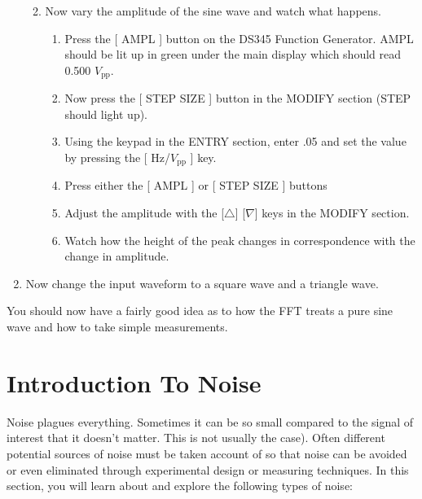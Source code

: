 \documentclass{../lab}
\begin{document}
\begin{enumerate}
\begin{enumerate}
\begin{enumerate}
        \end{enumerate}

        \item Now vary the amplitude of the sine wave and watch what happens.
        \begin{enumerate}
            \item Press the [ AMPL ] button on the DS345 Function Generator. AMPL should be lit up in green under the main display which should read 0.500 $V_\text{pp}$.

            \item Now press the [ STEP SIZE ] button in the MODIFY section (STEP should light up).

            \item Using the keypad in the ENTRY section, enter .05 and set the value by pressing the [ Hz/$V_\text{pp}$ ] key.

            \item Press either the [ AMPL ] or [ STEP SIZE ] buttons

            \item Adjust the amplitude with the [$\triangle$] [$\nabla$] keys in the MODIFY section.

            \item Watch how the height of the peak changes in correspondence with the change in amplitude.

        \end{enumerate}

    \end{enumerate}

    \item Now change the input waveform to a square wave and a triangle wave.

\end{enumerate}

You should now have a fairly good idea as to how the FFT treats a pure sine wave and how to take simple measurements.

\section{Introduction To Noise}

Noise plagues everything. Sometimes it can be so small compared to the signal of interest that it doesn't matter. This is not usually the case). Often different potential sources of noise must be taken account of so that noise can be avoided or even eliminated through experimental design or measuring techniques. In this section, you will learn about and explore the following types of noise:
\end{document}
